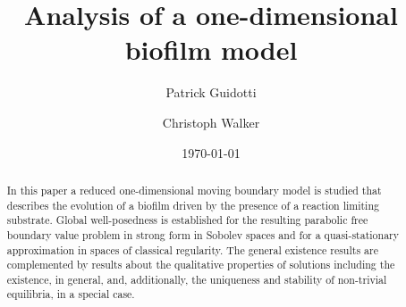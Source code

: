 \documentclass[reqno,11pt]{amsart}
\numberwithin{equation}{section}
\begin{document}

\title[A one-dimensional Biofilm model]{Analysis of a one-dimensional biofilm model}


%
\author{Patrick Guidotti}
\address{University of California, Irvine\\
Department of Mathematics\\
340 Rowland Hall\\
Irvine, CA 92697-3875\\
USA}

\author{Christoph Walker}
\address{Leibniz Universit\"at Hannover\\
Institut f\"ur Angewandte Mathematik\\
Welfengarten 1\\
30167 Hannover\\
Germany}
%
\date{\today}

\begin{abstract}
In this paper a reduced one-dimensional moving boundary model is
studied that describes the evolution of a biofilm driven by the
presence of a reaction limiting substrate. Global well-posedness is
established for the resulting parabolic free boundary value problem in
strong form in Sobolev spaces and for a quasi-stationary approximation
in spaces of classical regularity. The general existence results are
complemented by results about the qualitative properties of solutions
including the existence, in general, and, additionally, the uniqueness
and stability of non-trivial equilibria, in a special
case. 

\end{abstract}
%
\maketitle
\end{document}
